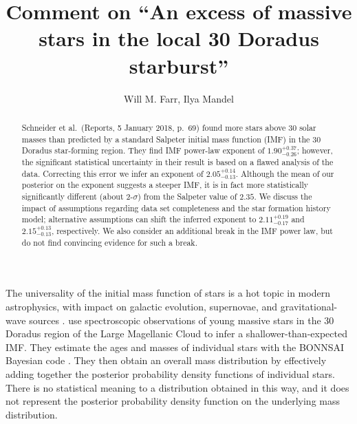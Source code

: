 \documentclass[apjl]{emulateapj}
\newcommand{\onesigrange}[3]{\ensuremath{#1^{+#2}_{-#3}}}
\newcommand{\alpharangeone}{\onesigrange{2.05}{0.14}{0.13}}
\newcommand{\alpharangethree}{\onesigrange{2.11}{0.19}{0.17}}
\newcommand{\alpharangefour}{\onesigrange{2.15}{0.13}{0.13}}
\begin{document}
\title{Comment on ``An excess of massive stars in the local 30 Doradus starburst''}

\author{Will M. Farr, Ilya Mandel}

\begin{abstract}
Schneider et al.~(Reports, 5 January 2018, p.~69) found more stars above 30 solar masses than predicted by a standard Salpeter initial mass function (IMF) in the 30 Doradus star-forming region.  They find IMF power-law exponent of $1.90^{+0.37}_{-0.26}$; however, the significant statistical uncertainty in their result is based on a flawed analysis of the data. Correcting this error we infer an exponent of $\alpharangeone$.  Although the mean of our posterior on the exponent suggests a steeper IMF, it is in fact more statistically significantly different (about 2-$\sigma$) from the Salpeter value of $2.35$.  We discuss the impact of assumptions regarding data set completeness and the star formation history model; alternative assumptions can shift the inferred exponent to $\alpharangethree$ and $\alpharangefour$, respectively.  We also consider an additional break in the IMF power law, but do not find convincing evidence for such a break.
\end{abstract}

\maketitle

The universality of the initial mass function of stars is a hot topic in modern astrophysics, with impact on galactic evolution, supernovae, and gravitational-wave sources \citep{Kroupa:2002,Bastian:2010,deMinkBelczynski:2015}.    \citet{Schneider:2018} use spectroscopic observations of young massive stars in the 30 Doradus region of the Large Magellanic Cloud to infer a shallower-than-expected IMF.  They estimate the ages and masses of individual stars with the BONNSAI Bayesian code \citep{Schneider:2017}.  They then obtain an overall mass distribution by effectively adding together the posterior probability density functions of individual stars.  There is no statistical meaning to a distribution obtained in this way, and it does not represent the posterior probability density function on the underlying mass distribution.
\end{document}
